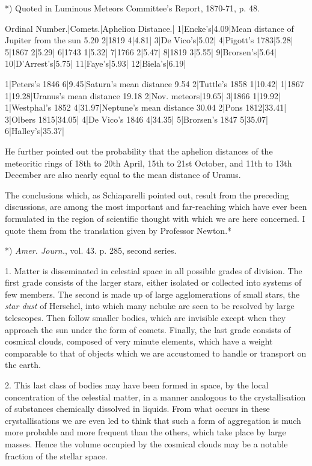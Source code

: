 \documentclass[a4paper, 12pt, oneside, polutonikogreek, english]{article}
\begin{document}
*) Quoted in Luminous Meteors Committee's Report, 1870-71, p. 48.

Ordinal Number.|Comets.|Aphelion Distance.| 
1|Encke's|4.09|Mean distance of Jupiter from the sun 5.20 
2|1819 4|4.81| 
3|De Vico's|5.02| 
4|Pigott's 1783|5.28| 
5|1867 2|5.29| 
6|1743 1|5.32| 
7|1766 2|5.47| 
8|1819 3|5.55| 
9|Brorsen's|5.64| 
10|D'Arrest's|5.75| 
11|Faye's|5.93| 
12|Biela's|6.19| 
 
1|Peters's 1846 6|9.45|Saturn's mean distance 9.54 
2|Tuttle's 1858 1|10.42| 
1|1867 1|19.28|Uranus's mean distance 19.18 
2|Nov. meteors|19.65| 
3|1866 1|19.92| 
1|Westphal's 1852 4|31.97|Neptune's mean distance 30.04 
2|Pons 1812|33.41| 
3|Olbers 1815|34.05| 
4|De Vico's 1846 4|34.35| 
5|Brorsen's 1847 5|35.07| 
6|Halley's|35.37| 

He further pointed out the probability that the aphelion distances of the meteoritic rings of 18th to 20th April, 15th to 21st October, and 11th to 13th December are also nearly equal to the mean distance of Uranus.

The conclusions which, as Schiaparelli pointed out, result from the preceding discussions, are among the most important and far-reaching which have ever been formulated in the region of scientific thought with which we are here concerned. I quote them from the translation given by Professor Newton.*

*) \emph{Amer. Journ.}, vol. 43. p. 285, second series.

1. Matter is disseminated in celestial space in all possible grades of division. The first grade consists of the larger stars, either isolated or collected into systems of few members. The second is made up of large agglomerations of small stars, the \emph{star dust} of Herschel, into which many nebulæ are seen to be resolved by large telescopes. Then follow smaller bodies, which are invisible except when they approach the sun under the form of comets. Finally, the last grade consists of cosmical clouds, composed of very minute elements, which have a weight comparable to that of objects which we are accustomed to handle or transport on the earth.

2. This last class of bodies may have been formed in space, by the local concentration of the celestial matter, in a manner analogous to the crystallisation of substances chemically dissolved in liquids. From what occurs in these crystallisations we are even led to think that such a form of aggregation is much more probable and more frequent than the others, which take place by large masses. Hence the volume occupied by the cosmical clouds may be a notable fraction of the stellar space.
\end{document}
